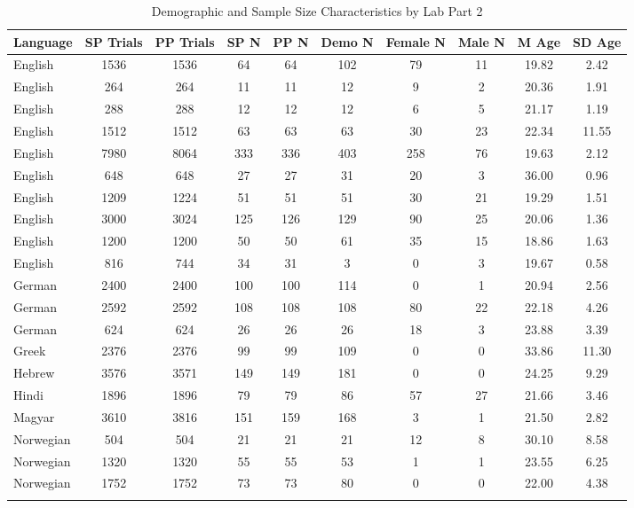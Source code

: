 \documentclass[
  man,floatsintext]{apa7}
\begin{document}
\begin{table}[tbp]

\begin{center}
\begin{threeparttable}

\caption{\label{tab:print-part2}Demographic and Sample Size Characteristics by Lab Part 2}

\footnotesize{

\begin{tabular}{lccccccccc}
\toprule
Language & SP 
Trials & PP 
Trials & SP 
N & PP 
N & Demo 
N & Female 
N & Male 
N & M 
Age & SD 
Age\\
\midrule
English & 1536 & 1536 & 64 & 64 & 102 & 79 & 11 & 19.82 & 2.42\\
English & 264 & 264 & 11 & 11 & 12 & 9 & 2 & 20.36 & 1.91\\
English & 288 & 288 & 12 & 12 & 12 & 6 & 5 & 21.17 & 1.19\\
English & 1512 & 1512 & 63 & 63 & 63 & 30 & 23 & 22.34 & 11.55\\
English & 7980 & 8064 & 333 & 336 & 403 & 258 & 76 & 19.63 & 2.12\\
English & 648 & 648 & 27 & 27 & 31 & 20 & 3 & 36.00 & 0.96\\
English & 1209 & 1224 & 51 & 51 & 51 & 30 & 21 & 19.29 & 1.51\\
English & 3000 & 3024 & 125 & 126 & 129 & 90 & 25 & 20.06 & 1.36\\
English & 1200 & 1200 & 50 & 50 & 61 & 35 & 15 & 18.86 & 1.63\\
English & 816 & 744 & 34 & 31 & 3 & 0 & 3 & 19.67 & 0.58\\
German & 2400 & 2400 & 100 & 100 & 114 & 0 & 1 & 20.94 & 2.56\\
German & 2592 & 2592 & 108 & 108 & 108 & 80 & 22 & 22.18 & 4.26\\
German & 624 & 624 & 26 & 26 & 26 & 18 & 3 & 23.88 & 3.39\\
Greek & 2376 & 2376 & 99 & 99 & 109 & 0 & 0 & 33.86 & 11.30\\
Hebrew & 3576 & 3571 & 149 & 149 & 181 & 0 & 0 & 24.25 & 9.29\\
Hindi & 1896 & 1896 & 79 & 79 & 86 & 57 & 27 & 21.66 & 3.46\\
Magyar & 3610 & 3816 & 151 & 159 & 168 & 3 & 1 & 21.50 & 2.82\\
Norwegian & 504 & 504 & 21 & 21 & 21 & 12 & 8 & 30.10 & 8.58\\
Norwegian & 1320 & 1320 & 55 & 55 & 53 & 1 & 1 & 23.55 & 6.25\\
Norwegian & 1752 & 1752 & 73 & 73 & 80 & 0 & 0 & 22.00 & 4.38\\
\bottomrule
\addlinespace
\end{tabular}

}
\end{threeparttable}
\end{center}
\end{table}
\end{document}
